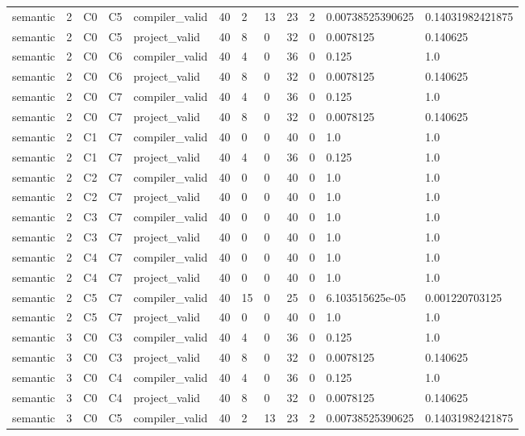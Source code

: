 \begin{tabular}{llllllllllll}
semantic & 2 & C0 & C5 & compiler\_valid & 40 & 2 & 13 & 23 & 2 & 0.00738525390625 & 0.14031982421875 \\
semantic & 2 & C0 & C5 & project\_valid & 40 & 8 & 0 & 32 & 0 & 0.0078125 & 0.140625 \\
semantic & 2 & C0 & C6 & compiler\_valid & 40 & 4 & 0 & 36 & 0 & 0.125 & 1.0 \\
semantic & 2 & C0 & C6 & project\_valid & 40 & 8 & 0 & 32 & 0 & 0.0078125 & 0.140625 \\
semantic & 2 & C0 & C7 & compiler\_valid & 40 & 4 & 0 & 36 & 0 & 0.125 & 1.0 \\
semantic & 2 & C0 & C7 & project\_valid & 40 & 8 & 0 & 32 & 0 & 0.0078125 & 0.140625 \\
semantic & 2 & C1 & C7 & compiler\_valid & 40 & 0 & 0 & 40 & 0 & 1.0 & 1.0 \\
semantic & 2 & C1 & C7 & project\_valid & 40 & 4 & 0 & 36 & 0 & 0.125 & 1.0 \\
semantic & 2 & C2 & C7 & compiler\_valid & 40 & 0 & 0 & 40 & 0 & 1.0 & 1.0 \\
semantic & 2 & C2 & C7 & project\_valid & 40 & 0 & 0 & 40 & 0 & 1.0 & 1.0 \\
semantic & 2 & C3 & C7 & compiler\_valid & 40 & 0 & 0 & 40 & 0 & 1.0 & 1.0 \\
semantic & 2 & C3 & C7 & project\_valid & 40 & 0 & 0 & 40 & 0 & 1.0 & 1.0 \\
semantic & 2 & C4 & C7 & compiler\_valid & 40 & 0 & 0 & 40 & 0 & 1.0 & 1.0 \\
semantic & 2 & C4 & C7 & project\_valid & 40 & 0 & 0 & 40 & 0 & 1.0 & 1.0 \\
semantic & 2 & C5 & C7 & compiler\_valid & 40 & 15 & 0 & 25 & 0 & 6.103515625e-05 & 0.001220703125 \\
semantic & 2 & C5 & C7 & project\_valid & 40 & 0 & 0 & 40 & 0 & 1.0 & 1.0 \\
semantic & 3 & C0 & C3 & compiler\_valid & 40 & 4 & 0 & 36 & 0 & 0.125 & 1.0 \\
semantic & 3 & C0 & C3 & project\_valid & 40 & 8 & 0 & 32 & 0 & 0.0078125 & 0.140625 \\
semantic & 3 & C0 & C4 & compiler\_valid & 40 & 4 & 0 & 36 & 0 & 0.125 & 1.0 \\
semantic & 3 & C0 & C4 & project\_valid & 40 & 8 & 0 & 32 & 0 & 0.0078125 & 0.140625 \\
semantic & 3 & C0 & C5 & compiler\_valid & 40 & 2 & 13 & 23 & 2 & 0.00738525390625 & 0.14031982421875 \\

\end{tabular}

